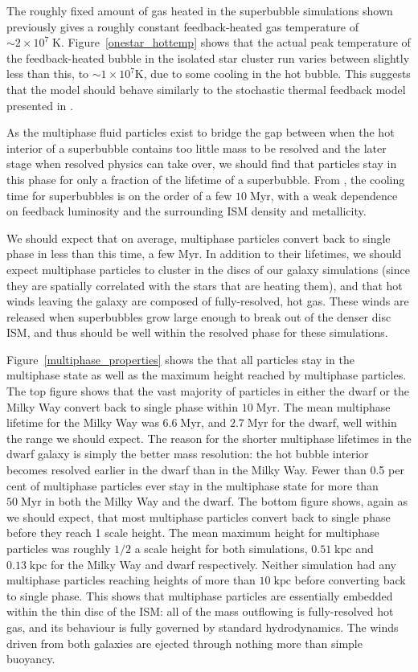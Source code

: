 The roughly fixed amount of gas heated in the superbubble simulations shown
previously gives a roughly constant feedback-heated gas temperature of $\sim
2\times10^7\;\mathrm{K}$.  Figure~\ref{onestar_hottemp}  shows that the actual
peak temperature of the feedback-heated bubble in the isolated star cluster run
varies between slightly less than this, to $\sim 1\times10^7\mathrm{K}$,
due to some cooling in the hot bubble.  This suggests that the model should
behave similarly to the stochastic thermal feedback model presented in
\citet{DallaVecchia2012}.  

As the multiphase fluid particles exist to bridge the gap between when the hot
interior of a superbubble contains too little mass to be resolved and the later
stage when resolved physics can take over, we should find that particles stay in
this phase for only a fraction of the lifetime of a superbubble.  From
\citet{MacLow1988}, the cooling time for superbubbles is on the order of a few
$10\;\mathrm{Myr}$, with a weak dependence on feedback luminosity and the
surrounding ISM density and metallicity.

We should expect that on average, multiphase particles convert back to single
phase in less than this time, a few $\mathrm{Myr}$.  In addition to their
lifetimes, we should expect multiphase particles to cluster in the discs of our
galaxy simulations (since they are spatially correlated with the stars that are
heating them), and that hot winds leaving the galaxy are composed of
fully-resolved, hot gas.  These winds are released when superbubbles grow large
enough to break out of the denser disc ISM, and thus should be well within the
resolved phase for these simulations.

Figure~\ref{multiphase_properties} shows the that all particles stay in
the multiphase state as well as the maximum height reached by multiphase
particles.  The top figure shows that the vast majority of particles in either
the dwarf or the Milky Way convert back to single phase within
$10\;\mathrm{Myr}$.  The mean multiphase lifetime for the Milky Way was
$6.6\;\mathrm{Myr}$, and $2.7\;\mathrm{Myr}$ for the dwarf, well within the
range we should expect.  The reason for the shorter multiphase lifetimes in the
dwarf galaxy is simply the better mass resolution: the hot bubble interior
becomes resolved earlier in the dwarf than in the Milky Way.  Fewer than 0.5 per
cent of multiphase particles ever stay in the multiphase state for more than
$50\;\mathrm{Myr}$ in both the Milky Way and the dwarf.  The bottom figure
shows, again as we should expect, that most multiphase particles convert back to
single phase before they reach 1 scale height.  The mean maximum height for
multiphase particles was roughly $1/2$ a scale height for both simulations,
$0.51\;\mathrm{kpc}$ and $0.13\;\mathrm{kpc}$ for the Milky Way and dwarf
respectively.  Neither simulation had any multiphase particles reaching heights
of more than $10\;\mathrm{kpc}$ before converting back to single phase.  This
shows that multiphase particles are essentially embedded within the thin disc of
the ISM: all of the mass outflowing is fully-resolved hot gas, and its behaviour
is fully governed by standard hydrodynamics.  The winds driven from both
galaxies are ejected through nothing more than simple buoyancy.

